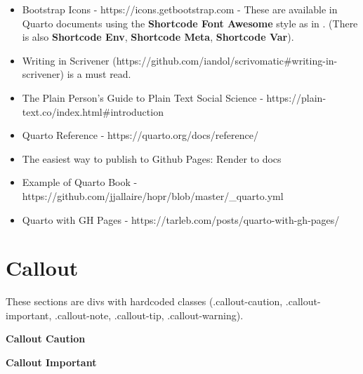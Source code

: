 \documentclass[
  12pt,
  a4paper,
  oneside,
  numbers=noenddot,
  titlepage,
  toclink=all,
  toc=bibliography]{scrbook}
\providecommand{\tightlist}{%
  \setlength{\itemsep}{0pt}\setlength{\parskip}{0pt}}\usepackage{longtable,booktabs,array}
\theoremstyle{definition}
\theoremstyle{definition}
\theoremstyle{definition}
\theoremstyle{plain}
\theoremstyle{plain}
\theoremstyle{plain}
\theoremstyle{plain}
\theoremstyle{plain}
\theoremstyle{remark}
\begin{document}
\begin{itemize}
\tightlist
\item
  Bootstrap Icons - https://icons.getbootstrap.com - These are available
  in Quarto documents using the \textbf{Shortcode Font Awesome} style as
  in \texttt{} . (There is also \textbf{Shortcode Env},
  \textbf{Shortcode Meta}, \textbf{Shortcode Var}).
\item
  Writing in Scrivener
  (https://github.com/iandol/scrivomatic\#writing-in-scrivener) is a
  must read.
\item
  The Plain Person's Guide to Plain Text Social Science -
  https://plain-text.co/index.html\#introduction
\item
  Quarto Reference - https://quarto.org/docs/reference/
\item
  The easiest way to publish to Github Pages: Render to docs
\item
  Example of Quarto Book -
  https://github.com/jjallaire/hopr/blob/master/\_quarto.yml
\item
  Quarto with GH Pages - https://tarleb.com/posts/quarto-with-gh-pages/
\end{itemize}

\hypertarget{sec-scriv53}{%
\section{Callout}\label{sec-scriv53}}

These sections are divs with hardcoded classes (.callout-caution,
.callout-important, .callout-note, .callout-tip, .callout-warning).

\begin{tcolorbox}[enhanced jigsaw, arc=.35mm, left=2mm, colframe=quarto-callout-caution-color-frame, bottomrule=.15mm, toprule=.15mm, colback=white, breakable, opacityback=0, rightrule=.15mm, leftrule=.75mm]
\begin{minipage}[t]{5.5mm}
\textcolor{quarto-callout-caution-color}{\faFire}
\end{minipage}%
\begin{minipage}[t]{\textwidth - 5.5mm}

\textbf{Callout Caution}\vspace{2mm}

\end{minipage}%
\end{tcolorbox}

\begin{tcolorbox}[enhanced jigsaw, arc=.35mm, left=2mm, colframe=quarto-callout-important-color-frame, bottomrule=.15mm, toprule=.15mm, colback=white, breakable, opacityback=0, rightrule=.15mm, leftrule=.75mm]
\begin{minipage}[t]{5.5mm}
\textcolor{quarto-callout-important-color}{\faExclamation}
\end{minipage}%
\begin{minipage}[t]{\textwidth - 5.5mm}

\textbf{Callout Important}\vspace{2mm}

\end{minipage}%
\end{tcolorbox}
\end{document}
